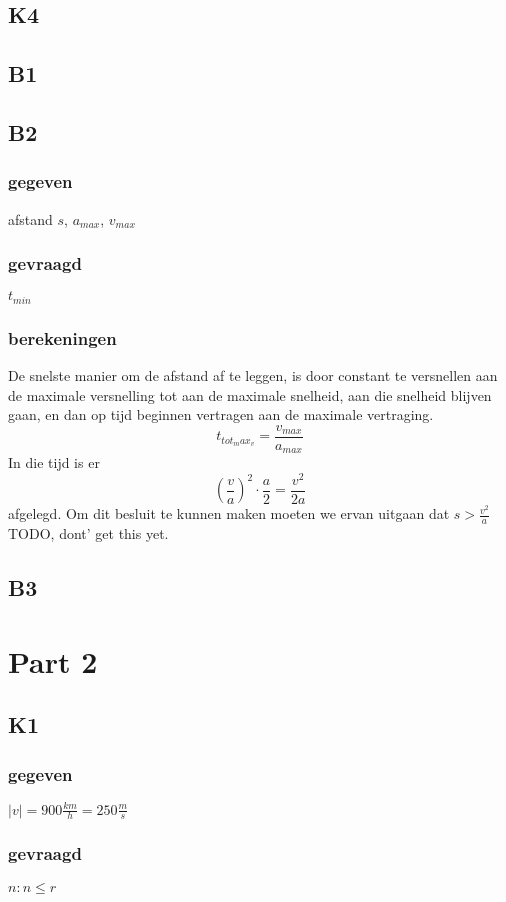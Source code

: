 \documentclass[10pt,a4paper]{article}
\begin{document}
\subsection{K4}

\subsection{B1}

\subsection{B2}
\subsubsection*{gegeven}
afstand $s$, $a_{max}$, $v_{max}$
\subsubsection*{gevraagd}
$t_{min}$
\subsubsection*{berekeningen}
De snelste manier om de afstand af te leggen, is door constant te versnellen aan de maximale versnelling tot aan de maximale snelheid, aan die snelheid blijven gaan, en dan op tijd beginnen vertragen aan de maximale vertraging.
\[
t_{tot_max_v} = \frac{v_{max}}{a_{max}}
\]
In die tijd is er
\[
\left(\frac{v}{a}\right)^{2}\cdot\frac{a}{2} = \frac{v^{2}}{2a}
\]
afgelegd. Om dit besluit te kunnen maken moeten we ervan uitgaan dat $s > \frac{v^{2}}{a}$
TODO, dont' get this yet.

\subsection{B3}

\section{Part 2}
\subsection{K1}
\subsubsection*{gegeven}
$|v|= 900\frac{km}{h} = 250\frac{m}{s}$
\subsubsection*{gevraagd}
$n: n \le r$
\end{document}
